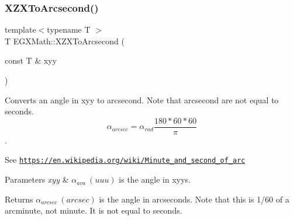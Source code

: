\subsubsection{\texorpdfstring{X\+Z\+X\+To\+Arcsecond()}{XZXToArcsecond()}}
{\footnotesize\ttfamily template$<$typename T $>$ \\
T E\+G\+X\+Math\+::\+X\+Z\+X\+To\+Arcsecond (\begin{DoxyParamCaption}\item[{const T \&}]{xyy }\end{DoxyParamCaption})}



Converts an angle in xyy to arcsecond. Note that arcsecond are not equal to seconds. \[\alpha_{arcsec}=\alpha_{rad}\frac{180 * 60 * 60}{\pi}\]. 

See \href{https://en.wikipedia.org/wiki/Minute_and_second_of_arc}{\tt https\+://en.\+wikipedia.\+org/wiki/\+Minute\+\_\+and\+\_\+second\+\_\+of\+\_\+arc} 
\begin{DoxyParams}{Parameters}
{\em xyy} & $\alpha_{ava}\ (uuu)$ is the angle in xyys. \\
\hline
\end{DoxyParams}
\begin{DoxyReturn}{Returns}
$\alpha_{arcsec}\ (arcsec)$ is the angle in arcseconds. Note that this is 1/60 of a arcminute, not minute. It is not equal to seconds. 
\end{DoxyReturn}
